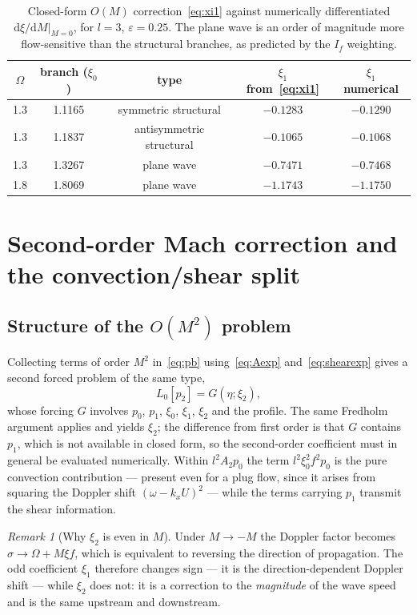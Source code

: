 \documentclass[11pt,a4paper]{article}
\newcommand{\Om}{\Omega}
\newcommand{\eps}{\varepsilon}
\newcommand{\dd}{\mathrm{d}}
\newcommand{\sig}{\hat\sigma}
\theoremstyle{plain}
\theoremstyle{remark}
\newtheorem{remark}[theorem]{Remark}
\begin{document}
\begin{table}[htb]
\centering
\begin{tabular}{@{}ccccc@{}}
\toprule
$\Om$ & branch ($\xi_0$) & type & $\xi_1$ from~\eqref{eq:xi1} & $\xi_1$ numerical\\
\midrule
1.3 & 1.1165 & symmetric structural & $-0.1283$ & $-0.1290$\\
1.3 & 1.1837 & antisymmetric structural & $-0.1065$ & $-0.1068$\\
1.3 & 1.3267 & plane wave & $-0.7471$ & $-0.7468$\\
1.8 & 1.8069 & plane wave & $-1.1743$ & $-1.1750$\\
\bottomrule
\end{tabular}
\caption{Closed-form $O(M)$ correction~\eqref{eq:xi1} against numerically differentiated
$\dd\xi/\dd M|_{M=0}$, for $l=3$, $\eps=0.25$. The plane wave is an order of magnitude more
flow-sensitive than the structural branches, as predicted by the $I_f$ weighting.}
\label{tab:xi1}
\end{table}

\section{Second-order Mach correction and the convection/shear split}\label{sec:om2}

\subsection{Structure of the $O(M^2)$ problem}
Collecting terms of order $M^2$ in~\eqref{eq:pb} using~\eqref{eq:Aexp} and~\eqref{eq:shearexp} gives a
second forced problem of the same type,
\begin{equation}
L_0[p_2]=G(\eta;\xi_2),
\label{eq:M2}
\end{equation}
whose forcing $G$ involves $p_0$, $p_1$, $\xi_0$, $\xi_1$, $\xi_2$ and the profile. The same Fredholm
argument applies and yields $\xi_2$; the difference from first order is that $G$ contains $p_1$, which
is not available in closed form, so the second-order coefficient must in general be evaluated
numerically. Within $l^2A_2p_0$ the term $l^2\xi_0^2f^2p_0$ is the pure convection contribution ---
present even for a plug flow, since it arises from squaring the Doppler shift $(\omega-k_xU)^2$ ---
while the terms carrying $p_1$ transmit the shear information.

\begin{remark}[Why $\xi_2$ is even in $M$]
Under $M\to-M$ the Doppler factor becomes $\sig\to\Om+M\xi f$, which is equivalent to reversing the
direction of propagation. The odd coefficient $\xi_1$ therefore changes sign --- it is the
direction-dependent Doppler shift --- while $\xi_2$ does not: it is a correction to the \emph{magnitude}
of the wave speed and is the same upstream and downstream.
\end{remark}
\end{document}
